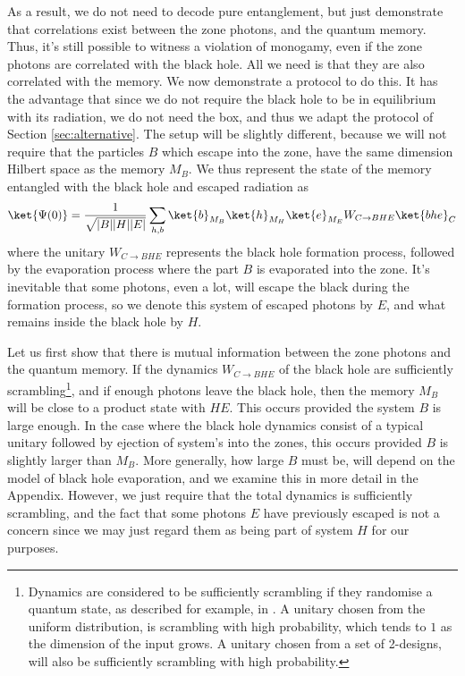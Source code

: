 \documentclass[11pt,a4paper]{article}
\begin{document}
As a result, we do not need to decode pure entanglement, but just demonstrate that correlations exist between the zone photons, and the quantum memory. Thus, it's still possible to witness a violation of monogamy, even if the zone photons are correlated with the black hole. All we need is that they are also correlated with the memory.
%
We now demonstrate a protocol to do this. It has the advantage that since we do not require the black hole to be in equilibrium with its radiation, we 
do not need the box, and thus we adapt the protocol of Section \ref{sec:alternative}.
The setup will be slightly different, because we will not require that the particles $B$ which escape into the zone, have the same dimension Hilbert space as the memory $M_B$. We thus represent the state of the memory entangled with the black hole and escaped radiation as
\begin{align}
\ket{\Psi(0)}=\frac{1}{\sqrt{|B||H||E|}}
\sum_{h,b}\ket{b}_{M_B}\ket{h}_{M_H}\ket{e}_{M_E} W_{C\rightarrow BHE} \ket{bhe}_{C}
\end{align}
where the unitary $W_{C\rightarrow BHE}$ represents the black hole formation process, followed by the evaporation process where the part $B$ is evaporated into the zone.
It's inevitable that some photons, even a lot, will escape the black during the formation process, so we  
denote this  system of escaped photons by $E$, and what remains inside the black hole by $H$. 

Let us first show that there is mutual information between the zone photons and the quantum memory. If the dynamics $W_{C\rightarrow BHE}$  of the black hole are sufficiently  scrambling\footnote{Dynamics are considered to be sufficiently scrambling if they randomise a quantum state, as described for example, in \cite{randomization}. A unitary chosen from the uniform distribution, is scrambling with high probability, which tends to $1$ as the dimension of the input grows. A unitary chosen from a set of 2-designs\cite{dankert2006exact}, will also be sufficiently scrambling with high probability.}, 
and if enough photons leave the black hole, then the memory $M_B$ will be close to a product state with $HE$. This occurs provided the system $B$ is large enough\cite{FQSW,HaydenPreskill,dupuis2010one}. In the case where the black hole dynamics consist of a typical unitary followed by ejection of system's into the zones\cite{bhlock,HaydenPreskill,sekino2008fast}, this occurs provided $B$ is slightly larger than $M_B$. More generally, how large $B$ must be, will depend on the model of black hole evaporation, and we examine this in more detail in the Appendix. However, we just require that the total dynamics is sufficiently scrambling, and the fact that some photons $E$ have previously escaped  is not a concern since we may just regard them as being part of system $H$ for our purposes.
\end{document}
